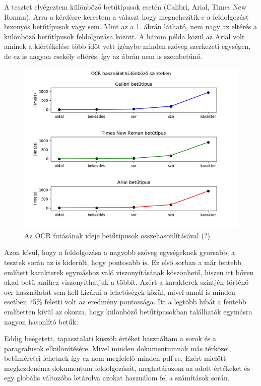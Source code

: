 A tesztet elvégeztem különböző betűtípusok esetén (Calibri, Arial, Times New Roman). Arra a kérdésre kerestem a választ hogy megnehezítik-e a feldolgozást bizonyos betűtípusok vagy sem. Mint az a \ref{fig:test font}. ábrán látható, nem nagy az eltérés a különböző betűtípusok feldolgozása között. A három példa közül az Arial volt aminek a kiértékelése több időt vett igénybe minden szöveg szerkezeti egységen, de ez is nagyon csekély eltérés, így az ábrán nem is szembetűnő.

\begin{figure}[H]
\centering
\includegraphics[scale=1]{images/test_ocr_font_types.png}
\caption{Az OCR futásának ideje betűtípusok összehasonlításával (?)}
\label{fig:test font}
\end{figure}

Azon kívül, hogy a feldolgozása a nagyobb szöveg egységeknek gyorsabb, a tesztek során az is kiderült, hogy pontosabb is. Ez első sorban a már fentebb említett karakterek egymáshoz való viszonyításának köszönhető, hiszen itt bőven akad betű amihez viszonyíthatjuk a többit. Azért a karakterek szintjén történő ocr használatát sem kell kizárni a lehetőségek közül, mivel annál is minden esetben 75\% feletti volt az eredmény pontossága. Itt a legtöbb hibát a fentebb említetten kívül az okozza, hogy különböző betűtípusokban találhatók egymásra nagyon hasonlító betűk. 

Eddig beégetett, tapasztalati küszöb értéket használtam a sorok és a paragrafusok elkülönítésére. Mivel minden dokumentumnak más térközei, betűméretei lehetnek így ez nem megfelelő minden pdf-re. Ezért mielőtt megkezdenéma  dokumentum feldolgozását, meghatározom az adott értékeket és egy globális változóba letárolva azokat használom fel a számítások során. 

